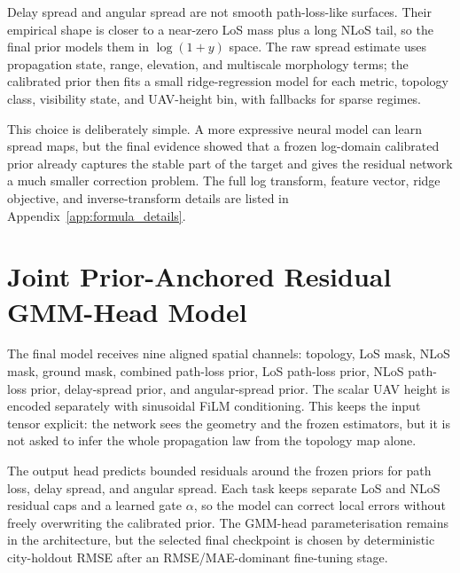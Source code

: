 Delay spread and angular spread are not smooth path-loss-like surfaces. Their
empirical shape is closer to a near-zero LoS mass plus a long NLoS tail, so the
final prior models them in \(\log(1+y)\) space. The raw spread estimate uses
propagation state, range, elevation, and multiscale morphology terms; the
calibrated prior then fits a small ridge-regression model for each metric,
topology class, visibility state, and UAV-height bin, with fallbacks for sparse
regimes.

This choice is deliberately simple. A more expressive neural model can learn
spread maps, but the final evidence showed that a frozen log-domain calibrated
prior already captures the stable part of the target and gives the residual
network a much smaller correction problem. The full log transform, feature
vector, ridge objective, and inverse-transform details are listed in
Appendix~\ref{app:formula_details}.

\section{Joint Prior-Anchored Residual GMM-Head Model}
\label{sec:try80_detail}

The final model receives nine aligned spatial channels: topology, LoS mask,
NLoS mask, ground mask, combined path-loss prior, LoS path-loss prior,
NLoS path-loss prior, delay-spread prior, and angular-spread prior. The scalar
UAV height is encoded separately with sinusoidal FiLM conditioning. This keeps
the input tensor explicit: the network sees the geometry and the frozen
estimators, but it is not asked to infer the whole propagation law from the
topology map alone.

The output head predicts bounded residuals around the frozen priors for path
loss, delay spread, and angular spread. Each task keeps separate LoS and NLoS
residual caps and a learned gate \(\alpha\), so the model can correct local
errors without freely overwriting the calibrated prior. The GMM-head
parameterisation remains in the architecture, but the selected final checkpoint
is chosen by deterministic city-holdout RMSE after an RMSE/MAE-dominant
fine-tuning stage.

